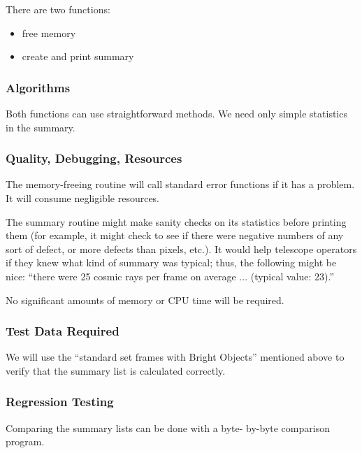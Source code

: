   There are two functions:

\begin{itemize}
  \item free memory
  \item create and print summary
\end{itemize}

\subsubsection {Algorithms}

  Both functions can use straightforward methods.
We need only simple statistics in the summary.

\subsubsection {Quality, Debugging, Resources}

  The memory-freeing routine will call standard error
functions if it has a problem.  It will consume negligible
resources.

  The summary routine might make sanity checks
on its statistics before printing them (for example,
it might check to see if there were negative numbers
of any sort of defect, or more defects than pixels, etc.).
It would help telescope operators if they knew what 
kind of summary was typical; thus, the following
might be nice: ``there were 25 cosmic rays per frame on
average ... (typical value: 23).''

  No significant amounts of memory or CPU time will
be required.

\subsubsection {Test Data Required}

  We will use the ``standard set frames with Bright Objects''
mentioned above to verify that the summary list
is calculated correctly.
  
\subsubsection {Regression Testing}

  Comparing the summary lists can be done with a byte-
by-byte comparison program.



